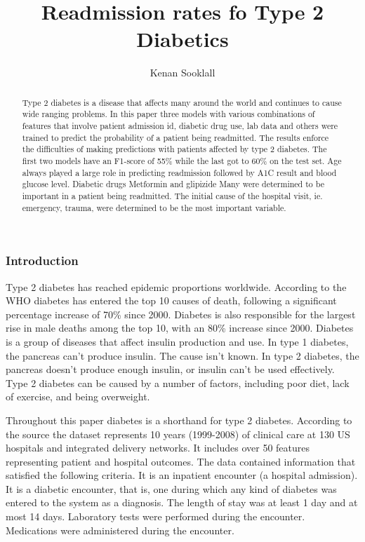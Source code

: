 \documentclass[5p]{elsarticle} %
\begin{document}
\begin{frontmatter}

  \title{Readmission rates fo Type 2 Diabetics}
    \author[CUNY-SPS]{Kenan Sooklall}
  
  \begin{abstract}
  Type 2 diabetes is a disease that affects many around the world and
  continues to cause wide ranging problems. In this paper three models
  with various combinations of features that involve patient admission
  id, diabetic drug use, lab data and others were trained to predict the
  probability of a patient being readmitted. The results enforce the
  difficulties of making predictions with patients affected by type 2
  diabetes. The first two models have an F1-score of 55\% while the last
  got to 60\% on the test set. Age always played a large role in
  predicting readmission followed by A1C result and blood glucose level.
  Diabetic drugs Metformin and glipizide Many were determined to be
  important in a patient being readmitted. The initial cause of the
  hospital visit, ie. emergency, trauma, were determined to be the most
  important variable.
  \end{abstract}
  
 \end{frontmatter}

\hypertarget{introduction}{%
\subsubsection{Introduction}\label{introduction}}

Type 2 diabetes has reached epidemic proportions worldwide. According to
the WHO diabetes has entered the top 10 causes of death, following a
significant percentage increase of 70\% since 2000. Diabetes is also
responsible for the largest rise in male deaths among the top 10, with
an 80\% increase since 2000. Diabetes is a group of diseases that affect
insulin production and use. In type 1 diabetes, the pancreas can't
produce insulin. The cause isn't known. In type 2 diabetes, the pancreas
doesn't produce enough insulin, or insulin can't be used effectively.
Type 2 diabetes can be caused by a number of factors, including poor
diet, lack of exercise, and being overweight.

Throughout this paper diabetes is a shorthand for type 2 diabetes.
According to the source the dataset represents 10 years (1999-2008) of
clinical care at 130 US hospitals and integrated delivery networks. It
includes over 50 features representing patient and hospital outcomes.
The data contained information that satisfied the following criteria. It
is an inpatient encounter (a hospital admission). It is a diabetic
encounter, that is, one during which any kind of diabetes was entered to
the system as a diagnosis. The length of stay was at least 1 day and at
most 14 days. Laboratory tests were performed during the encounter.
Medications were administered during the encounter.
\end{document}
